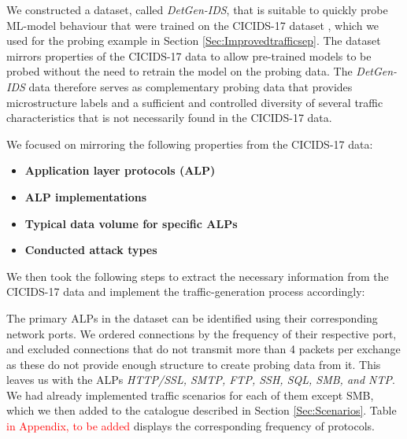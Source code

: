 \documentclass[runningheads]{llncs}
\begin{document}
We constructed a dataset, called \textit{DetGen-IDS}, that is suitable to quickly probe ML-model behaviour that were trained on the CICIDS-17 dataset \cite{sharafaldin2018toward}, which we used for the probing example in Section \ref{Sec:Improvedtrafficsep}. The dataset mirrors properties of the CICIDS-17 data to allow pre-trained models to be probed without the need to retrain the model on the probing data.
The \textit{DetGen-IDS} data therefore serves as complementary probing data that provides microstructure labels and a sufficient and controlled diversity of several traffic characteristics that is not necessarily found in the CICIDS-17 data.

We focused on mirroring the following properties from the CICIDS-17 data:
\begin{itemize}

\item \textbf{Application layer protocols (ALP)}
\item \textbf{ALP implementations}
\item \textbf{Typical data volume for specific ALPs}
\item \textbf{Conducted attack types}

\end{itemize}

We then took the following steps to extract the necessary information from the CICIDS-17 data and implement the traffic-generation process accordingly:

The primary ALPs in the dataset can be identified using their corresponding network ports. We ordered connections by the frequency of their respective port, and excluded connections that do not transmit more than 4 packets per exchange as these do not provide enough structure to create probing data from it. This leaves us with the ALPs \textit{HTTP/SSL, SMTP, FTP, SSH, SQL, SMB, and NTP}. We had already implemented traffic scenarios for each of them except SMB, which we then added to the catalogue described in Section \ref{Sec:Scenarios}. Table \textcolor{red}{in Appendix, to be added} displays the corresponding frequency of protocols.
\end{document}
